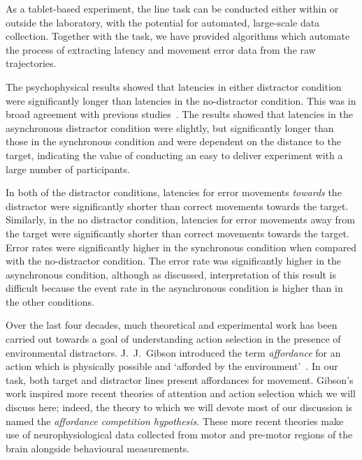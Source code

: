 \documentclass[10pt,letterpaper]{article}
\begin{document}
As a tablet-based experiment, the line task can be conducted either
within or outside the laboratory, with the potential for automated,
large-scale data collection.
%
Together with the task, we have provided algorithms
which automate the process of extracting latency and movement error
data from the raw trajectories.

The psychophysical results showed that latencies in either distractor
condition were significantly longer than latencies in the
no-distractor condition. This was in broad agreement with previous
studies~\cite{tipper_selective_1992,meegan_visual_1999,pratt_action-centered_1994}.
The results showed that latencies in
the asynchronous distractor condition were slightly, but significantly longer than
those in the synchronous condition and were dependent on the distance
to the target, indicating the value of conducting an easy to deliver
experiment with a large number of participants.

In both of the distractor conditions, latencies for error movements
\emph{towards} the distractor were significantly shorter than correct
movements towards the target. Similarly, in the no distractor
condition, latencies for error movements away from the target were
significantly shorter than correct movements towards the target. Error
rates were significantly higher in the synchronous condition when
compared with the no-distractor condition. The error rate was
significantly higher in the asynchronous condition, although as
discussed, interpretation of this result is difficult because the
event rate in the asynchronous condition is higher than in the other
conditions.

Over the last four decades, much theoretical and experimental work has
been carried out towards a goal of understanding action selection in
the presence of environmental distractors. J.~J.~Gibson introduced the
term \emph{affordance} for an action which is physically possible and
`afforded by the environment'~\cite{gibson_ecological_1979}. In our
task, both target and distractor lines present affordances for
movement. Gibson's work inspired more recent theories of attention and
action selection which we will discuss here; indeed, the theory to
which we will devote most of our discussion is named the
\emph{affordance competition hypothesis}. These more recent theories
make use of neurophysiological data collected from motor and pre-motor
regions of the brain alongside behavioural measurements.
\end{document}
